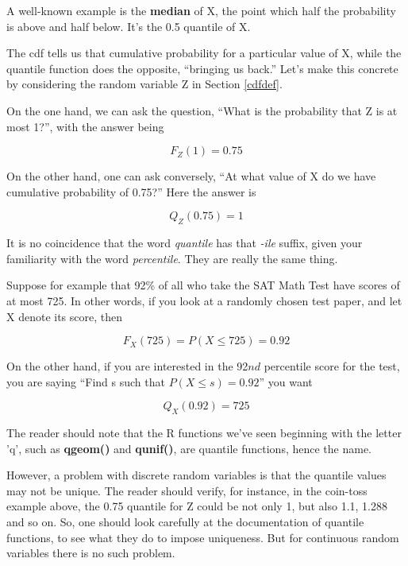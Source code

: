 A well-known example is the {\bf median} of X, the point which half
the probability is above and half below.  It's the 0.5 quantile of X.

The cdf tells us that cumulative probability for a particular value of
X, while the quantile function does the opposite, ``bringing us back.''
Let's make this concrete by considering the random variable Z in Section
\ref{cdfdef}.

On the one hand, we can ask the question, ``What is the probability that
Z is at most 1?'', with the answer being

\begin{equation}
F_Z(1) = 0.75 
\end{equation}

On the other hand, one can ask conversely, ``At what value of X do we
have cumulative probability of 0.75?''  Here the answer is

\begin{equation}
Q_Z(0.75) = 1
\end{equation}

It is no coincidence that the word {\it quantile} has that 
{\it -ile} suffix, given your familiarity with the word {\it
percentile}.  They are really the same thing.

Suppose for example that 92\% of all who take the SAT Math Test have
scores of at most 725.  In other words, if you look at a randomly chosen
test paper, and let X denote its score, then

\begin{equation}
F_X(725) = P(X \leq 725) = 0.92
\end{equation}

On the other hand, if you are interested in the 92$nd$ percentile score
for the test, you are saying ``Find s such that $P(X \leq s) = 0.92$'' you
want

\begin{equation}
Q_X(0.92) = 725
\end{equation}

The reader should note that the R functions we've seen beginning with
the letter 'q', such as {\bf qgeom()} and {\bf qunif()}, are quantile
functions, hence the name.

However, a problem with discrete random variables is that the quantile
values may not be unique.  The reader should verify, for instance, in
the coin-toss example above, the 0.75 quantile for Z could be not only
1, but also 1.1, 1.288 and so on.  So, one should look carefully at the
documentation of quantile functions, to see what they do to impose
uniqueness.  But for continuous random variables there is no such
problem.

